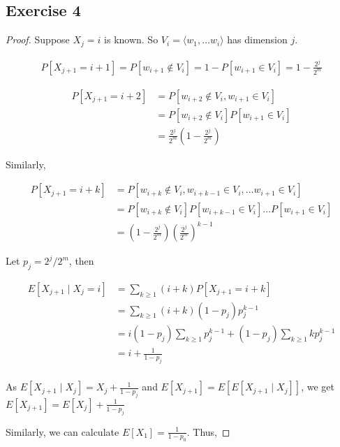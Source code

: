 \documentclass{article}
\begin{document}
\subsection*{Exercise 4}

\begin{proof}

Suppose $X_j = i$ is known. So $V_i = \langle w_1, \ldots w_i \rangle$ has dimension $j$.

\begin{align*}
    P[X_{j+1} = i+1] = P[w_{i+1} \not \in V_i] = 1 - P[w_{i+1} \in V_i] = 1 - \frac{2^j}{2^m}
\end{align*}

\begin{align*}
    P[X_{j+1} = i+2] &= P[w_{i+2} \not \in V_i, w_{i+1} \in V_i] \\
    &= P[w_{i+2} \not \in V_i] P[w_{i+1} \in V_i] \\
    &= \frac{2^j}{2^m} \left(1 - \frac{2^j}{2^m}\right)
\end{align*}

Similarly, 

\begin{align*}
    P[X_{j+1} = i+k] &= P[w_{i+k} \not \in V_i, w_{i+k-1} \in V_i, \ldots w_{i+1} \in V_i] \\
    &= P[w_{i+k} \not \in V_i] P[w_{i+k-1} \in V_i] \ldots P[w_{i+1} \in V_i] \\
    &= \left(1 - \frac{2^j}{2^m}\right)\left(\frac{2^j}{2^m}\right)^{k-1}
\end{align*}

Let $p_j = 2^{j}/2^m$, then

\begin{align*}
    E[X_{j+1} \mid X_{j} = i] &= \sum_{k \geq 1} (i+k) P[X_{j+1} = i+k] \\
    &= \sum_{k \geq 1} (i+k) \left(1 - p_j\right) p_j^{k-1} \\
    &= i \left(1 - p_j\right) \sum_{k \geq 1} p_j^{k-1} + (1 - p_j) \sum_{k \geq 1} k p_j^{k-1} \\
    &= i + \frac{1}{1-p_j} \\
\end{align*}

As $E[X_{j+1} \mid X_j] = X_j + \frac{1}{1-p_j}$ and $E[X_{j+1}] = E[E[X_{j+1} \mid X_j]]$, we get $E[X_{j+1}] = E[X_j] + \frac{1}{1-p_j}$

Similarly, we can calculate $E[X_1] = \frac{1}{1-p_0}$. Thus,


\end{proof}
\end{document}
